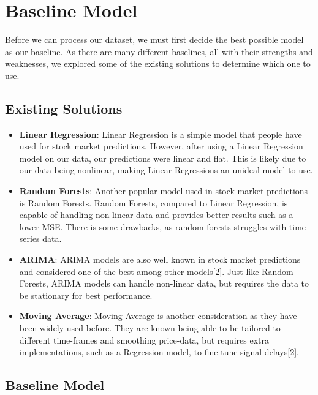 \documentclass[conference]{IEEEtran}
\begin{document}
\section{Baseline Model}

Before we can process our dataset, we must first decide the best possible model as our baseline. As there are many different baselines, all with their strengths and weaknesses, we explored some of the existing solutions to determine which one to use.

\subsection{Existing Solutions}

\begin{itemize}

    \item \textbf{Linear Regression}: Linear Regression is a simple model that people have used for stock market predictions. However, after using a Linear Regression model on our data, our predictions were linear and flat. This is likely due to our data being nonlinear, making Linear Regressions an unideal model to use.   

    \item \textbf{Random Forests}: Another popular model used in stock market predictions is Random Forests. Random Forests, compared to Linear Regression, is capable of handling non-linear data and provides better results such as a lower MSE. There is some drawbacks, as random forests struggles with time series data.

    \item \textbf{ARIMA}: ARIMA models are also well known in stock market predictions and considered one of the best among other models[2]. Just like Random Forests, ARIMA models can handle non-linear data, but requires the data to be stationary for best performance. 

    \item \textbf{Moving Average}: Moving Average is another consideration as they have been widely used before. They are known being able to be tailored to different time-frames and smoothing price-data, but requires extra implementations, such as a Regression model, to fine-tune signal delays[2].

\end{itemize}

\subsection{Baseline Model}
\end{document}
